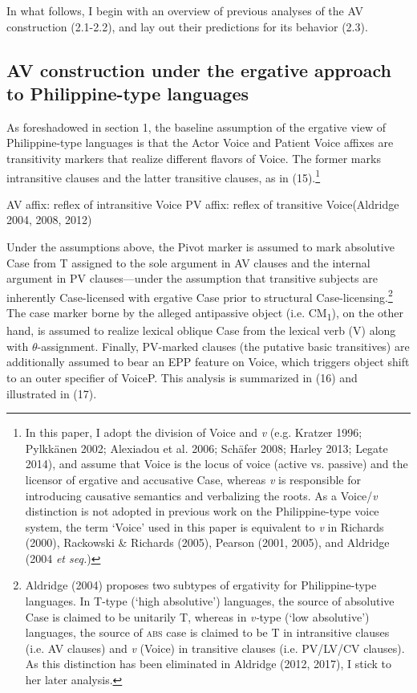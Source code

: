 \documentclass[10pt]{article}
\begin{document}
In what follows, I begin with an overview of previous analyses of the AV construction (2.1-2.2), and lay out their predictions for its behavior (2.3).


\subsection{AV construction under the ergative approach to Philippine-type languages}

\noindent As foreshadowed in section 1, the baseline assumption of the ergative view of Philippine-type languages is that the Actor Voice and Patient Voice affixes are transitivity markers that realize different flavors of Voice. The former marks intransitive clauses and the latter transitive clauses, as in (15).\footnote{In this paper, I adopt the division of Voice and \textit{v} (e.g. Kratzer 1996; Pylkkänen 2002; Alexiadou et al. 2006; Schäfer 2008; Harley 2013; Legate 2014), and assume that Voice is the locus of voice (active vs. passive) and the licensor of ergative and accusative Case, whereas \textit{v} is responsible for introducing causative semantics and verbalizing the roots. As a Voice/\textit{v} distinction is not adopted in previous work on the Philippine-type voice system, the term `Voice' used in this paper is equivalent to \textit{v} in Richards (2000), Rackowski \& Richards (2005), Pearson (2001, 2005), and Aldridge (2004 \textit{et seq.})}

\begin{exe}
\ex 
    \begin{xlist}
\ex AV affix: reflex of intransitive Voice 
\ex PV affix: reflex of transitive Voice\hspace{+3.cm}(Aldridge 2004, 2008, 2012)
\end{xlist}
\end{exe}

Under the assumptions above, the Pivot marker is assumed to mark absolutive Case from T assigned to the sole argument in AV clauses and the internal argument in PV clauses---under the assumption that transitive subjects are inherently Case-licensed with ergative Case prior to structural Case-licensing.\footnote{Aldridge (2004) proposes two subtypes of ergativity for Philippine-type languages. In T-type (`high absolutive') languages, the source of absolutive Case is claimed to be unitarily T, whereas in \textit{v-}type (`low absolutive') languages, the source of \textsc{abs} case is claimed to be T in intransitive clauses (i.e. AV clauses) and \textit{v} (Voice) in transitive clauses (i.e. PV/LV/CV clauses). As this distinction has been eliminated in Aldridge (2012, 2017), I stick to her later analysis.} The case marker borne by the alleged antipassive object (i.e. CM\textsubscript{1}), on the other hand, is assumed to realize lexical oblique Case from the lexical verb (V) along with $\theta$-assignment. Finally, PV-marked clauses (the putative basic transitives) are additionally assumed to bear an EPP feature on Voice, which triggers object shift to an outer specifier of VoiceP. This analysis is summarized in (16) and illustrated in (17).
\end{document}
